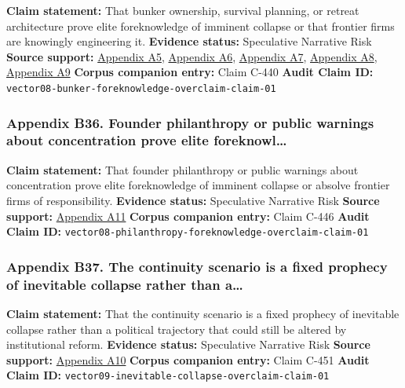 \documentclass[
  american,
  11pt,
  letterpaper,
]{article}
\begin{document}
\textbf{Claim statement:} That bunker ownership, survival planning, or
retreat architecture prove elite foreknowledge of imminent collapse or
that frontier firms are knowingly engineering it. \textbf{Evidence
status:} Speculative Narrative Risk \textbf{Source support:}
\hyperref[ch-09-appendix-a5-sam-altman-s-manifest-destiny]{Appendix A5},
\hyperref[ch-09-appendix-a6-inside-mark-zuckerbergs-top-secret-hawaii-compound]{Appendix
A6},
\hyperref[ch-09-appendix-a7-mark-zuckerberg-downplays-his-5-000-square-foot-underground-bunker-in-hawaii-just-a-little-shelter]{Appendix
A7},
\hyperref[ch-09-appendix-a8-why-silicon-valley-billionaires-are-prepping-for-the-apocalypse-in-new-zealand]{Appendix
A8},
\hyperref[ch-09-appendix-a9-new-zealand-woos-the-wealthy-with-golden-visa-changes]{Appendix
A9} \textbf{Corpus companion entry:} Claim C-440 \textbf{Audit Claim
ID:} \texttt{vector08-bunker-foreknowledge-overclaim-claim-01}

\subsubsection{Appendix B36. Founder philanthropy or public warnings
about concentration prove elite
foreknowl\ldots{}}\label{ch-09-appendix-b36-founder-philanthropy-or-public-warnings-about-concentration-prove-elite-foreknowl}

\textbf{Claim statement:} That founder philanthropy or public warnings
about concentration prove elite foreknowledge of imminent collapse or
absolve frontier firms of responsibility. \textbf{Evidence status:}
Speculative Narrative Risk \textbf{Source support:}
\hyperref[ch-09-appendix-a11-the-adolescence-of-technology]{Appendix
A11} \textbf{Corpus companion entry:} Claim C-446 \textbf{Audit Claim
ID:} \texttt{vector08-philanthropy-foreknowledge-overclaim-claim-01}

\subsubsection{Appendix B37. The continuity scenario is a fixed prophecy
of inevitable collapse rather than
a\ldots{}}\label{ch-09-appendix-b37-the-continuity-scenario-is-a-fixed-prophecy-of-inevitable-collapse-rather-than-a}

\textbf{Claim statement:} That the continuity scenario is a fixed
prophecy of inevitable collapse rather than a political trajectory that
could still be altered by institutional reform. \textbf{Evidence
status:} Speculative Narrative Risk \textbf{Source support:}
\hyperref[ch-09-appendix-a10-annual-economic-report-2026]{Appendix A10}
\textbf{Corpus companion entry:} Claim C-451 \textbf{Audit Claim ID:}
\texttt{vector09-inevitable-collapse-overclaim-claim-01}
\end{document}
